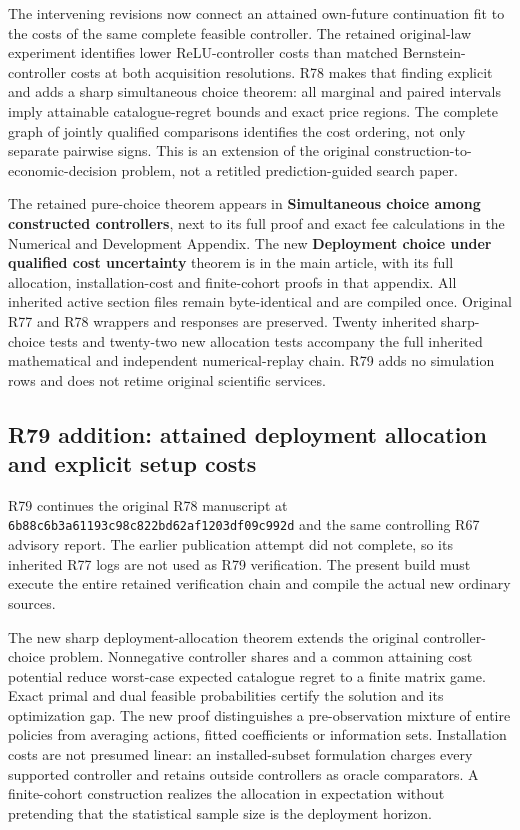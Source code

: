 \documentclass[ecta,nameyear,draft]{econsocart}
\begin{document}
The intervening revisions now connect an attained own-future
continuation fit to the costs of the same complete feasible controller.
The retained original-law experiment identifies lower ReLU-controller
costs than matched Bernstein-controller costs at both acquisition
resolutions. R78 makes that finding explicit and adds a sharp
simultaneous choice theorem: all marginal and paired intervals imply
attainable catalogue-regret bounds and exact price regions. The complete
graph of jointly qualified comparisons identifies the cost ordering, not
only separate pairwise signs. This is an extension of the original
construction-to-economic-decision problem, not a retitled
prediction-guided search paper.

The retained pure-choice theorem appears in \textbf{Simultaneous choice
among constructed controllers}, next to its full proof and exact fee
calculations in the Numerical and Development Appendix. The new
\textbf{Deployment choice under qualified cost uncertainty} theorem is
in the main article, with its full allocation, installation-cost and
finite-cohort proofs in that appendix. All inherited active section
files remain byte-identical and are compiled once. Original R77 and R78
wrappers and responses are preserved. Twenty inherited sharp-choice
tests and twenty-two new allocation tests accompany the full inherited
mathematical and independent numerical-replay chain. R79 adds no
simulation rows and does not retime original scientific services.

\hypertarget{r79-addition-attained-deployment-allocation-and-explicit-setup-costs}{%
\subsection{R79 addition: attained deployment allocation and explicit
setup
costs}\label{r79-addition-attained-deployment-allocation-and-explicit-setup-costs}}

R79 continues the original R78 manuscript at
\nolinkurl{6b88c6b3a61193c98c822bd62af1203df09c992d} and the same
controlling R67 advisory report. The earlier publication attempt did not
complete, so its inherited R77 logs are not used as R79 verification.
The present build must execute the entire retained verification chain
and compile the actual new ordinary sources.

The new sharp deployment-allocation theorem extends the original
controller-choice problem. Nonnegative controller shares and a common
attaining cost potential reduce worst-case expected catalogue regret to
a finite matrix game. Exact primal and dual feasible probabilities
certify the solution and its optimization gap. The new proof
distinguishes a pre-observation mixture of entire policies from
averaging actions, fitted coefficients or information sets. Installation
costs are not presumed linear: an installed-subset formulation charges
every supported controller and retains outside controllers as oracle
comparators. A finite-cohort construction realizes the allocation in
expectation without pretending that the statistical sample size is the
deployment horizon.
\end{document}
